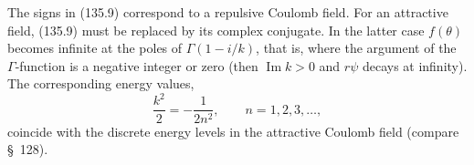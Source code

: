The signs in (135.9) correspond to a repulsive Coulomb field. For an
attractive field, (135.9) must be replaced by its complex conjugate. In the
latter case $f(\theta)$ becomes infinite at the poles of
$\Gamma(1-i/k)$, that is, where the argument of the $\Gamma$-function is a
negative integer or zero (then $\operatorname{Im}k>0$ and $r\psi$ decays at
infinity). The corresponding energy values,
\[
 \frac{k^2}{2}=-\frac{1}{2n^2},\qquad n=1,2,3,\ldots,
\]
coincide with the discrete energy levels in the attractive Coulomb field
(compare \S~128).
